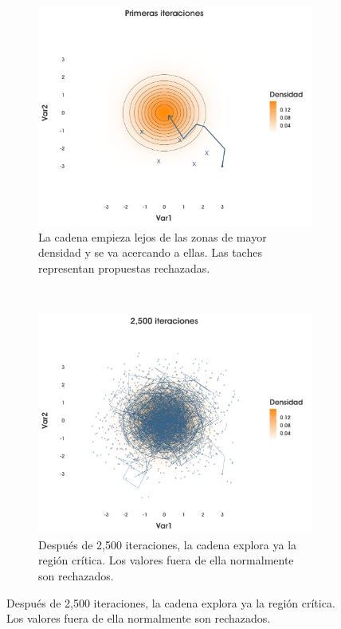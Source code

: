 \begin{figure}[h]
    \centering
    \begin{subfigure}{0.3\textwidth}
        \includegraphics[width=\textwidth]{Figs/Bayes/Ejemplo_RWM_A}
        \caption{La cadena empieza lejos de las zonas de mayor densidad y se va acercando a ellas. Las taches representan propuestas rechazadas.}
    \end{subfigure}
    ~ 
    \begin{subfigure}{0.3\textwidth}
        \includegraphics[width=\textwidth]{Figs/Bayes/Ejemplo_RWM_B}
        \caption{Después de 2,500 iteraciones, la cadena explora ya la región crítica. Los valores fuera de ella normalmente son rechazados.}

\end{subfigure}
\end{figure}
